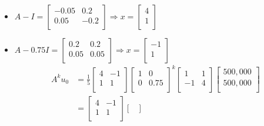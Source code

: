 \documentclass{article}
\begin{document}
\begin{itemize}
    \item $
        A-I =
        \begin{bmatrix}
            -0.05 & 0.2\\
            0.05 & -0.2\\
        \end{bmatrix}
        \Rightarrow
        x =
        \begin{bmatrix}
            4\\
            1\\
        \end{bmatrix}
    $
    \item $
        A-0.75I =
        \begin{bmatrix}
            0.2 & 0.2\\
            0.05 & 0.05\\
        \end{bmatrix}
        \Rightarrow
        x =
        \begin{bmatrix}
            -1\\
            1\\
        \end{bmatrix}
    $
    \begin{align*}
        A^ku_0 &= \frac{1}{5}
        \begin{bmatrix}
            4 & -1\\
            1 & 1\\
        \end{bmatrix}
        \begin{bmatrix}
            1 & 0\\
            0 & 0.75\\
        \end{bmatrix}^k
        \begin{bmatrix}
            1 & 1\\
            -1 & 4\\
        \end{bmatrix}
        \begin{bmatrix}
            500,000\\
            500,000\\
        \end{bmatrix}\\
        &=
        \begin{bmatrix}
            4 & -1\\
            1 & 1\\
        \end{bmatrix}
        \begin{bmatrix}

\end{bmatrix}
\end{align*}
\end{itemize}
\end{document}
